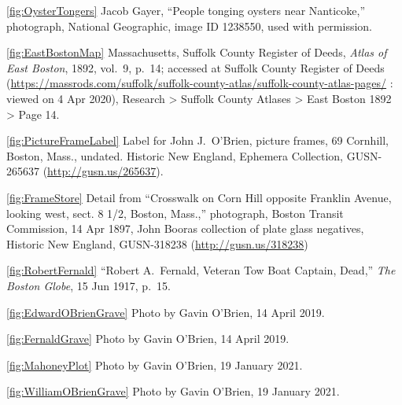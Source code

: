 \ref{fig:OysterTongers} Jacob Gayer, ``People tonging oysters near Nanticoke,'' photograph, National Geographic, image ID 1238550, used with permission.

\ref{fig:EastBostonMap} Massachusetts, Suffolk County Register of Deeds, \textit{Atlas of East Boston}, 1892, vol.\ 9, p.\ 14; accessed at Suffolk County Register of Deeds (\url{https://massrods.com/suffolk/suffolk-county-atlas/suffolk-county-atlas-pages/} : viewed on 4 Apr 2020), Research > Suffolk County Atlases > East Boston 1892 > Page 14.

\ref{fig:PictureFrameLabel} Label for John J.\ O'Brien, picture frames, 69 Cornhill, Boston, Mass., undated. Historic New England, Ephemera Collection, GUSN-265637 (\url{http://gusn.us/265637}).

\ref{fig:FrameStore} Detail from ``Crosswalk on Corn Hill opposite Franklin Avenue, looking west, sect. 8 1/2, Boston, Mass.,'' photograph, Boston Transit Commission, 14 Apr 1897, John Booras collection of plate glass negatives, Historic New England, GUSN-318238 (\url{http://gusn.us/318238}) 

\ref{fig:RobertFernald} ``Robert A.\ Fernald, Veteran Tow Boat Captain, Dead,'' \textit{The Boston Globe}, 15 Jun 1917, p.\ 15.

\ref{fig:EdwardOBrienGrave} Photo by Gavin O'Brien, 14 April 2019.

\ref{fig:FernaldGrave} Photo by Gavin O'Brien, 14 April 2019.

\ref{fig:MahoneyPlot} Photo by Gavin O'Brien, 19 January 2021.

\ref{fig:WilliamOBrienGrave} Photo by Gavin O'Brien, 19 January 2021.